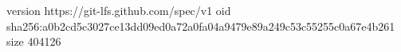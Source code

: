 version https://git-lfs.github.com/spec/v1
oid sha256:a0b2cd5c3027ce13dd09ed0a72a0fa04a9479e89a249c53c55255c0a67e4b261
size 404126
